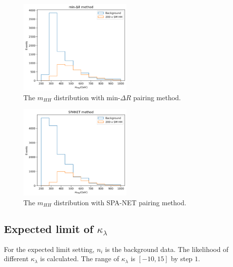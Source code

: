 \documentclass[12pt]{article}
\begin{document}
		\begin{figure}[htpb]
			\centering
			\includegraphics[width=0.5\textwidth]{mhh_distribution_min_dR.png}
			\caption{The $m_{H H}$ distribution with $\text{min-}\Delta R$ pairing method.}
			\label{fig:mhh_distribution_min_dR}
		\end{figure}
		\begin{figure}[htpb]
			\centering
			\includegraphics[width=0.5\textwidth]{mhh_distribution_SPANET.png}
			\caption{The $m_{H H}$ distribution with SPA-NET pairing method.}
			\label{fig:mhh_distribution_SPANET}
		\end{figure}
	\subsection{Expected limit of \texorpdfstring{$\kappa_\lambda$}{kappa}}%
	\label{sub:expected_limit_of_kappa}
		For the expected limit setting, $n_i$ is the background data. The likelihood of different $\kappa_\lambda$ is calculated. The range of $\kappa_\lambda$ is $[-10,15]$ by step $1$.
\end{document}
